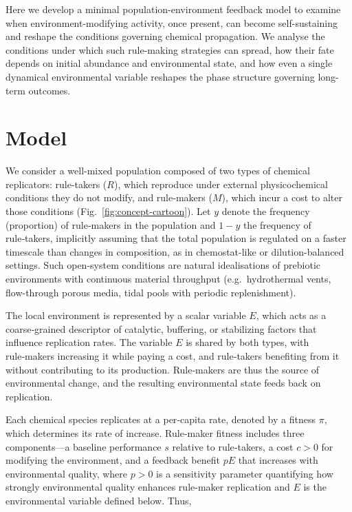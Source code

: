 \documentclass[11pt]{article}
\newcommand{\rev}[1]{#1}
\begin{document}
Here we develop a minimal population-environment feedback model to examine when environment-modifying activity, once present, can become self-sustaining and reshape the conditions governing chemical propagation. We analyse the conditions under which such rule-making strategies can spread, how their fate depends on initial abundance and environmental state, and how even a single dynamical environmental variable reshapes the phase structure governing long-term outcomes.
 \section{Model}

We consider a well-mixed population composed of two types of chemical replicators: rule‑takers ($R$), which reproduce under external physicochemical conditions they do not modify, and rule‑makers ($M$), which incur a cost to alter those conditions (Fig.~\ref{fig:concept-cartoon}). Let $y$ denote the frequency \rev{(proportion)} of rule‑makers \rev{in the population} and $1-y$ the frequency of rule‑takers, implicitly assuming that the total population is regulated on a faster timescale than changes in composition, as in chemostat-like or dilution-balanced settings. \rev{Such open-system conditions are natural idealisations of prebiotic environments with continuous material throughput (e.g.\ hydrothermal vents, flow-through porous media, tidal pools with periodic replenishment).} 

The local environment is represented by a scalar variable $E$, which acts as a coarse‑grained descriptor of catalytic, buffering, or stabilizing factors that influence replication rates. The variable $E$ is shared by both types, with rule‑makers increasing it while paying a cost, and rule‑takers benefiting from it without contributing to its production. Rule‑makers are thus the source of environmental change, and the resulting environmental state feeds back on replication. 

Each chemical species replicates at a per‑capita rate, denoted by a fitness $\pi$, which determines its rate of increase. Rule‑maker fitness includes three components—a baseline performance $s$ relative to rule‑takers, a cost $c>0$ for modifying the environment, and a feedback benefit $pE$ that increases with environmental quality\rev{, where $p > 0$ is a sensitivity parameter quantifying how strongly environmental quality enhances rule-maker replication and $E$ is the environmental variable defined below}. Thus,
\end{document}
